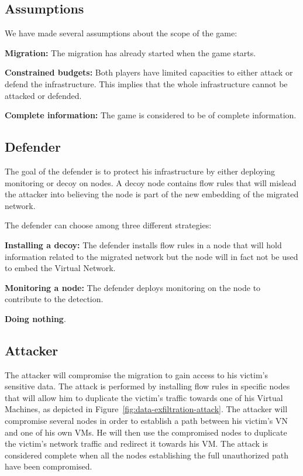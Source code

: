 \subsection{Assumptions}
We have made several assumptions about the scope of the game:
\begin{description}
\item \textbf{Migration: } The migration has already started when the game starts.
\item \textbf{Constrained budgets: } Both players have limited capacities to either attack or defend the infrastructure.
This implies that the whole infrastructure cannot be attacked or defended.
\item \textbf{Complete information: } The game is considered to be of complete information.
\end{description}

\subsection{Defender}
The goal of the defender is to protect his infrastructure by either deploying monitoring or decoy on nodes. A decoy node contains flow rules that will mislead the attacker into believing the node is part of the new embedding of the migrated network.

The defender can choose among three different strategies:
\begin{description}
\item \textbf{Installing a decoy: } The defender installs flow rules in a node that will hold information related to the migrated network but the node will in fact not be used to embed the Virtual Network.
\item \textbf{Monitoring a node: } The defender deploys monitoring on the node to contribute to the detection.
\item \textbf{Doing nothing}.
\end{description}

\subsection{Attacker}
The attacker will compromise the migration to gain access to his victim's sensitive data.
The attack is performed by installing flow rules in specific nodes that will allow him to duplicate the victim's traffic towards one of his Virtual Machines, as depicted in Figure~\ref{fig:data-exfiltration-attack}. 
The attacker will compromise several nodes in order to establish a path between his victim's VN and one of his own VMs.
He will then use the compromised nodes to duplicate the victim's network traffic and redirect it towards his VM.
The attack is considered complete when all the nodes establishing the full unauthorized path have been compromised.

